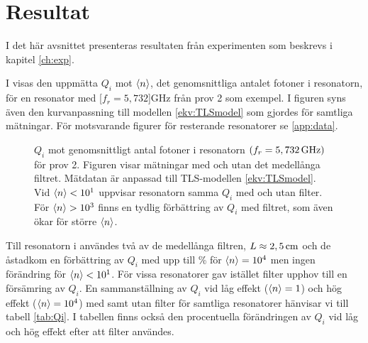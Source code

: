\documentclass[main.tex]{subfiles}
\begin{document}
\chapter{Resultat}
\label{sec:results}
I det här avsnittet presenteras resultaten från experimenten som beskrevs i kapitel \ref{ch:exp}. 

 
I  visas den uppmätta $Q_i$ mot $\expval{n}$, det genomsnittliga antalet fotoner i resonatorn, för en resonator med \unit[$f_r=5,732$]{GHz} från prov 2 som exempel. I figuren syns även den kurvanpassning till modellen \eqref{ekv:TLSmodel} som gjordes för samtliga mätningar. För motsvarande figurer för resterande resonatorer se \ref{app:data}.%

\begin{figure}[H]
  \centering
  \setlength{}
  \setlength\figureheight{9em}
  
  \caption{$Q_i$ mot genomsnittligt antal fotoner i resonatorn $(f_r=\unit[5,732]{GHz})$ för prov 2. Figuren visar mätningar med och utan det medellånga filtret. Mätdatan är anpassad till TLS-modellen \eqref{ekv:TLSmodel}. Vid $\expval{n}<10^1$ uppvisar resonatorn samma $Q_i$ med och utan filter. För $\expval{n}>10^3$ finns en tydlig förbättring av $Q_i$ med filtret, som även ökar för större $\expval{n}$.}
  \label{fig:Qi_n}
\end{figure}


Till resonatorn i  användes två av de medellånga filtren, $L\approx \unit[2,5]{cm}$ och de åstadkom en förbättring av $Q_i$ med upp till \unit[46]{\%} för $\expval{n}=10^4$ men ingen förändring för $\expval{n}<10^1$. För vissa resonatorer gav istället filter upphov till en försämring av $Q_i$. En sammanställning av $Q_i$ vid låg effekt ($\expval{n}=1$) och hög effekt ($\expval{n}=10^4$) med samt utan filter för samtliga resonatorer hänvisar vi till tabell \ref{tab:Qi}. I tabellen finns också den procentuella förändringen av $Q_i$ vid låg och hög effekt efter att filter användes.
\end{document}
